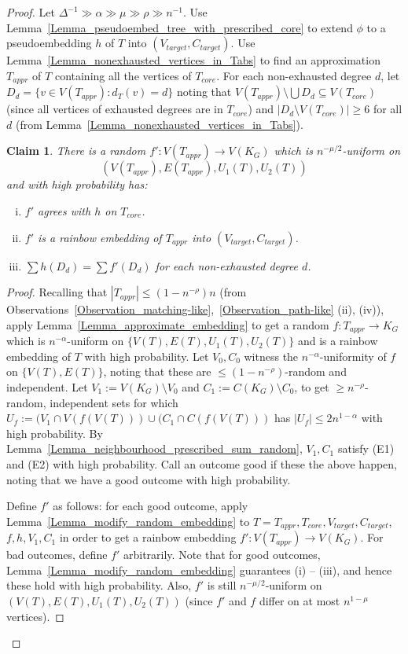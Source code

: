\documentclass[a4paper,11pt,hidelinks]{amsart}
\newtheorem{claim}[theorem]{Claim}
\theoremstyle{definition}
\begin{document}
\begin{proof}
Let $\Delta^{-1}\gg\alpha\gg\mu\gg \rho\gg n^{-1}$.
Use Lemma~\ref{Lemma_pseudoembed_tree_with_prescribed_core} to extend $\phi$ to a pseudoembedding $h$ of $T$ into  $(V_{target}, C_{target})$. Use Lemma~\ref{Lemma_nonexhausted_vertices_in_Tabs} to find an approximation $T_{appr}$ of $T$ containing all the vertices of $T_{core}$.
For each non-exhausted degree $d$, let $D_d=\{v\in V(T_{appr}): d_T(v)=d\}$ noting that $V(T_{appr})\setminus \bigcup D_d\subseteq V(T_{core})$ (since all vertices of exhausted degrees are in $T_{core}$) and $|D_d\setminus V(T_{core})|\geq 6$ for all $d$ (from Lemma~\ref{Lemma_nonexhausted_vertices_in_Tabs}).
\begin{claim}
There is a random $f':V(T_{appr})\to V(K_G)$ which is $n^{-\mu/2}$-uniform on $$(V(T_{appr}), E(T_{appr}), U_1(T), U_2(T))$$ and with high probability has:
\begin{enumerate}[(i)]
\item $f'$ agrees with $h$ on $T_{core}$.
\item $f'$ is a rainbow embedding of $T_{appr}$ into $(V_{target}, C_{target})$.
\item $\sum h(D_d)=\sum f'(D_d)$ for each non-exhausted degree $d$.
\end{enumerate}
\end{claim}
\begin{proof}

Recalling that $|T_{appr}|\leq (1-n^{-\rho})n$ (from Observations~\ref{Observation_matching-like},~\ref{Observation_path-like} (ii), (iv)), apply Lemma~\ref{Lemma_approximate_embedding} to get a random   $f: T_{appr}\to K_G$ which is $n^{-\alpha}$-uniform on $\{V(T), E(T), U_1(T), U_2(T)\}$ and is a rainbow embedding of $T$ with high probability. Let $V_0, C_0$ witness the $n^{-\alpha}$-uniformity of $f$ on $\{V(T), E(T)\}$, noting that these are $\leq (1-n^{-\rho})$-random and independent.
Let $V_1:=V(K_G)\setminus V_0$ and $C_1:=C(K_G)\setminus C_0$, to get $\geq n^{-\rho}$-random, independent sets for which $U_f:=(V_1\cap V(f(V(T)))\cup (C_1\cap C(f(V(T)))$  has $|U_f|\leq 2n^{1-\alpha}$ with high probability. By Lemma~\ref{Lemma_neighbourhood_prescribed_sum_random}, $V_1, C_1$ satisfy (E1) and (E2) with high probability.
Call an outcome good if  these the above happen, noting that we have a good outcome with high probability.


Define $f'$ as follows: for each good outcome, apply Lemma~\ref{Lemma_modify_random_embedding} to $T=T_{appr}, T_{core}, V_{target}, C_{target}$, $f, h, V_1, C_1$ in order to get a rainbow embedding   $f':V(T_{appr})\to V(K_G)$. For bad outcomes, define $f'$ arbitrarily.
Note that for good outcomes, Lemma~\ref{Lemma_modify_random_embedding} guarantees (i) -- (iii), and hence these hold with high probability. Also,  $f'$ is still $n^{-\mu/2}$-uniform on $(V(T), E(T), U_1(T), U_2(T))$ (since $f'$ and $f$ differ on at most $n^{1-\mu}$ vertices).
\end{proof}


\end{proof}
\end{document}
